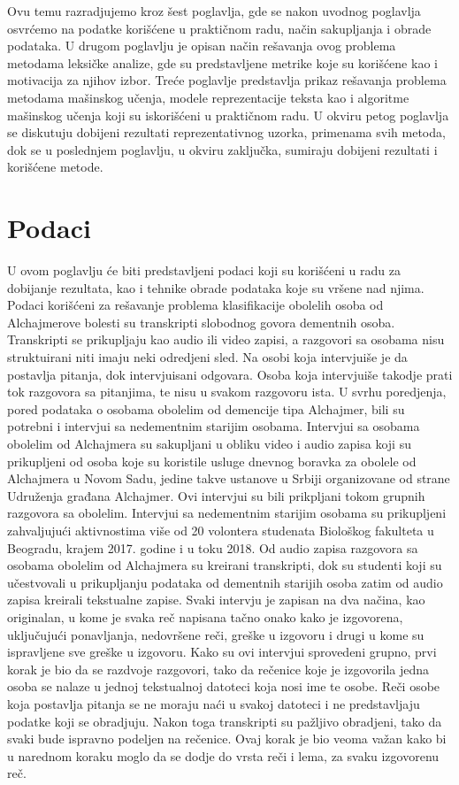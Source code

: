 \documentclass[12pt,oneside]{memoir}
\begin{document}
Ovu temu razradjujemo kroz šest poglavlja, gde se nakon uvodnog poglavlja osvrćemo na podatke korišćene u praktičnom radu, način sakupljanja i obrade podataka.  U drugom poglavlju je opisan način rešavanja ovog problema metodama leksičke analize,  gde su predstavljene metrike koje su korišćene kao i motivacija za njihov izbor. Treće poglavlje predstavlja prikaz rešavanja problema metodama mašinskog učenja,  modele reprezentacije teksta kao i algoritme mašinskog učenja koji su iskorišćeni u praktičnom radu.  U okviru petog poglavlja se diskutuju dobijeni rezultati reprezentativnog uzorka,  primenama svih metoda, dok se u poslednjem poglavlju,  u okviru zaključka,  sumiraju dobijeni rezultati i korišćene metode. 


\chapter{Podaci}

U ovom poglavlju će biti predstavljeni podaci koji su korišćeni u radu za dobijanje rezultata,  kao i tehnike obrade podataka koje su vršene nad njima.  Podaci korišćeni za rešavanje problema klasifikacije obolelih osoba od Alchajmerove bolesti su transkripti slobodnog govora dementnih osoba. Transkripti se prikupljaju kao audio ili video zapisi,  a razgovori sa osobama nisu struktuirani niti imaju neki odredjeni sled.  Na osobi koja intervjuiše je da postavlja pitanja,  dok intervjuisani odgovara.  Osoba koja intervjuiše takodje prati tok razgovora sa pitanjima,  te nisu u svakom razgovoru ista.  
U svrhu poredjenja, pored podataka o osobama obolelim od demencije tipa Alchajmer,  bili su potrebni i intervjui sa nedementnim starijim osobama. Intervjui sa osobama obolelim od Alchajmera su sakupljani u obliku video i audio zapisa koji su prikupljeni od osoba koje su koristile usluge dnevnog boravka za obolele od Alchajmera u Novom Sadu,  jedine takve ustanove u Srbiji organizovane od strane Udruženja građana Alchajmer.  Ovi intervjui su bili prikpljani tokom grupnih razgovora sa obolelim.  Intervjui sa nedementnim starijim osobama su prikupljeni zahvaljujući aktivnostima više od 20 volontera studenata Biološkog fakulteta u Beogradu,  krajem 2017. godine i u toku 2018.
Od audio zapisa razgovora sa osobama obolelim od Alchajmera su kreirani transkripti,  dok su studenti koji su učestvovali u prikupljanju podataka od dementnih starijih osoba zatim od audio zapisa kreirali tekstualne zapise.  Svaki intervju je zapisan na dva načina,  kao originalan, u kome je svaka reč napisana tačno onako kako je izgovorena,  uključujući ponavljanja,  nedovršene reči,  greške u izgovoru i drugi u kome su ispravljene sve greške u izgovoru.  Kako su ovi intervjui sprovedeni grupno,  prvi korak je bio da se razdvoje razgovori,  tako da rečenice koje je izgovorila jedna osoba se nalaze u jednoj tekstualnoj datoteci koja nosi ime te osobe.
Reči osobe koja postavlja pitanja se ne moraju naći u svakoj datoteci i ne predstavljaju podatke koji se obradjuju.  Nakon toga transkripti su pažljivo obradjeni,  tako da svaki bude ispravno podeljen na rečenice.  Ovaj korak je bio veoma važan kako bi u narednom koraku moglo da se dodje do vrsta reči i lema,  za svaku izgovorenu reč.  
\end{document}
